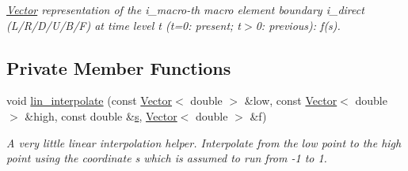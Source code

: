 \begin{DoxyCompactItemize}
\begin{DoxyCompactList}\small\item\em \hyperlink{classoomph_1_1Vector}{Vector} representation of the i\+\_\+macro-\/th macro element boundary i\+\_\+direct (L/\+R/\+D/\+U/\+B/F) at time level t (t=0\+: present; t$>$0\+: previous)\+: f(s). \end{DoxyCompactList}\end{DoxyCompactItemize}
\subsection*{Private Member Functions}
\begin{DoxyCompactItemize}
\item 
void \hyperlink{classoomph_1_1TubeDomain_a4e893ffe544f30d0160c41b2aff75d7f}{lin\+\_\+interpolate} (const \hyperlink{classoomph_1_1Vector}{Vector}$<$ double $>$ \&low, const \hyperlink{classoomph_1_1Vector}{Vector}$<$ double $>$ \&high, const double \&\hyperlink{cfortran_8h_ab7123126e4885ef647dd9c6e3807a21c}{s}, \hyperlink{classoomph_1_1Vector}{Vector}$<$ double $>$ \&f)
\begin{DoxyCompactList}\small\item\em A very little linear interpolation helper. Interpolate from the low point to the high point using the coordinate s which is assumed to run from -\/1 to 1. \end{DoxyCompactList}\end{DoxyCompactItemize}
